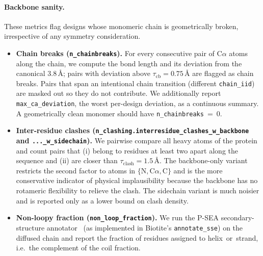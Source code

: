 \documentclass{article}
\theoremstyle{plain}
\theoremstyle{definition}
\theoremstyle{remark}
\begin{document}
\paragraph{Backbone sanity.} These metrics flag designs whose monomeric chain is geometrically broken, irrespective of any symmetry consideration.
\begin{itemize}
  \item \textbf{Chain breaks (\texttt{n\_chainbreaks}).} For every consecutive pair of C$\alpha$ atoms along the chain, we compute the bond length and its deviation from the canonical $3.8$\,\AA{}; pairs with deviation above $\tau_\text{cb}=0.75$\,\AA{} are flagged as chain breaks. Pairs that span an intentional chain transition (different \texttt{chain\_iid}) are masked out so they do not contribute. We additionally report \texttt{max\_ca\_deviation}, the worst per-design deviation, as a continuous summary. A geometrically clean monomer should have \texttt{n\_chainbreaks}~=~0.
  \item \textbf{Inter-residue clashes (\texttt{n\_clashing.interresidue\_clashes\_w\_backbone} and \texttt{...\_w\_sidechain}).} We pairwise compare all heavy atoms of the protein and count pairs that (i) belong to residues at least two apart along the sequence and (ii) are closer than $\tau_\text{clash}=1.5$\,\AA{}. The backbone-only variant restricts the second factor to atoms in $\{\text{N},\text{C}\alpha,\text{C}\}$ and is the more conservative indicator of physical implausibility because the backbone has no rotameric flexibility to relieve the clash. The sidechain variant is much noisier and is reported only as a lower bound on clash density.
  \item \textbf{Non-loopy fraction (\texttt{non\_loop\_fraction}).} We run the P-SEA secondary-structure annotator~\cite{labesse_p-sea_1997} (as implemented in Biotite's \texttt{annotate\_sse}) on the diffused chain and report the fraction of residues assigned to helix~or~strand, i.e.\ the complement of the coil fraction.
\end{itemize}
\end{document}

